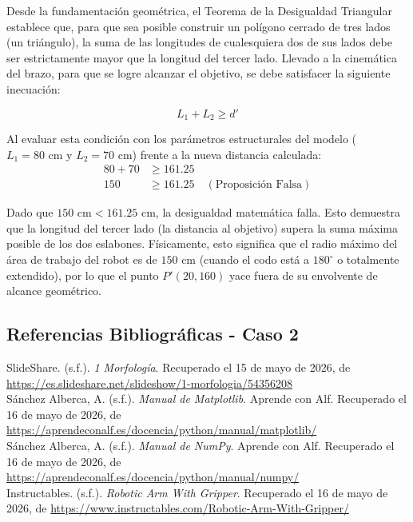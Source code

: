\documentclass[12pt]{article}
\begin{document}
Desde la fundamentación geométrica, el Teorema de la Desigualdad Triangular establece que, para que sea posible construir un polígono cerrado de tres lados (un triángulo), la suma de las longitudes de cualesquiera dos de sus lados debe ser estrictamente mayor que la longitud del tercer lado. Llevado a la cinemática del brazo, para que se logre alcanzar el objetivo, se debe satisfacer la siguiente inecuación:

$$L_1 + L_2 \geq d'$$

Al evaluar esta condición con los parámetros estructurales del modelo ($L_1 = 80 \text{ cm}$ y $L_2 = 70 \text{ cm}$) frente a la nueva distancia calculada:
\begin{align*}
    80 + 70 &\geq 161.25 \\
    150 &\geq 161.25 \quad (\text{Proposición Falsa})
\end{align*}

Dado que $150 \text{ cm} < 161.25 \text{ cm}$, la desigualdad matemática falla. Esto demuestra que la longitud del tercer lado (la distancia al objetivo) supera la suma máxima posible de los dos eslabones. Físicamente, esto significa que el radio máximo del área de trabajo del robot es de $150 \text{ cm}$ (cuando el codo está a $180^\circ$ o totalmente extendido), por lo que el punto $P'(20,160)$ yace fuera de su envolvente de alcance geométrico.


\newpage

\subsection{Referencias Bibliográficas - Caso 2}

\noindent SlideShare. (s.f.). \textit{1 Morfología}. Recuperado el 15 de mayo de 2026, de \url{https://es.slideshare.net/slideshow/1-morfologia/54356208} \\

\noindent Sánchez Alberca, A. (s.f.). \textit{Manual de Matplotlib}. Aprende con Alf. Recuperado el 16 de mayo de 2026, de \url{https://aprendeconalf.es/docencia/python/manual/matplotlib/} \\

\noindent Sánchez Alberca, A. (s.f.). \textit{Manual de NumPy}. Aprende con Alf. Recuperado el 16 de mayo de 2026, de \url{https://aprendeconalf.es/docencia/python/manual/numpy/} \\

\noindent Instructables. (s.f.). \textit{Robotic Arm With Gripper}. Recuperado el 16 de mayo de 2026, de \url{https://www.instructables.com/Robotic-Arm-With-Gripper/} \\
\end{document}
